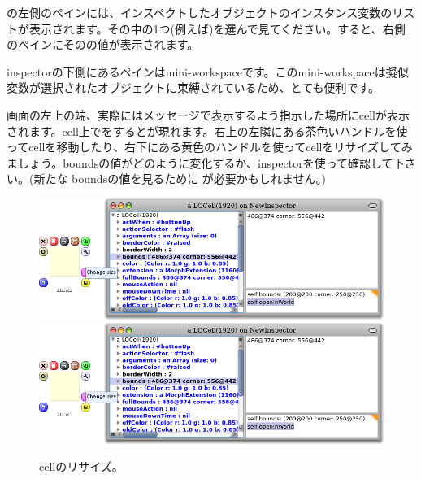\documentclass[a4paper,10pt,twoside]{book}
\begin{document}
の左側のペインには、インスペクトしたオブジェクトのインスタンス変数のリストが表示されます。その中の1つ(例えば\mbox{})を選んで見てください。すると、右側のペインにそのの値が表示されます。


inspectorの下側にあるペインはmini-workspaceです。このmini-workspaceは擬似変数\self が選択されたオブジェクトに束縛されているため、とても便利です。


画面の左上の端、実際にはメッセージで表示するよう指示した場所にcellが表示されます。cell上で\metaclick をするとが現れます。右上の左隣にある茶色いハンドルを使ってcellを移動したり、右下にある黄色のハンドルを使ってcellをリサイズしてみましょう。boundsの値がどのように変化するか、inspectorを使って確認して下さい。(新たな boundsの値を見るために  \actclick が必要かもしれません。)

\begin{figure}[htbp]
\centering
\ifluluelse
	{\includegraphics[width=\textwidth]{LOCellResize} }
	{\includegraphics[scale=0.7]{LOCellResize} }
\caption{cellのリサイズ。}
\end{figure}
\end{document}
